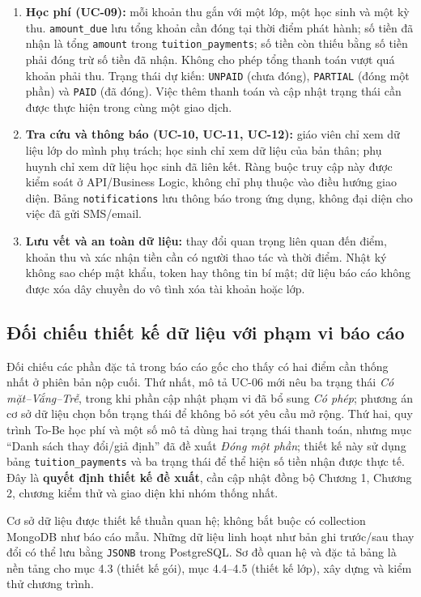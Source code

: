 \begin{enumerate}
\item \textbf{Học phí (UC-09):} mỗi khoản thu gắn với một lớp, một học sinh và một kỳ thu. \texttt{amount\_due} lưu tổng khoản cần đóng tại thời điểm phát hành; số tiền đã nhận là tổng \texttt{amount} trong \texttt{tuition\_payments}; số tiền còn thiếu bằng số tiền phải đóng trừ số tiền đã nhận. Không cho phép tổng thanh toán vượt quá khoản phải thu. Trạng thái dự kiến: \texttt{UNPAID} (chưa đóng), \texttt{PARTIAL} (đóng một phần) và \texttt{PAID} (đã đóng). Việc thêm thanh toán và cập nhật trạng thái cần được thực hiện trong cùng một giao dịch.
\item \textbf{Tra cứu và thông báo (UC-10, UC-11, UC-12):} giáo viên chỉ xem dữ liệu lớp do mình phụ trách; học sinh chỉ xem dữ liệu của bản thân; phụ huynh chỉ xem dữ liệu học sinh đã liên kết. Ràng buộc truy cập này được kiểm soát ở API/Business Logic, không chỉ phụ thuộc vào điều hướng giao diện. Bảng \texttt{notifications} lưu thông báo trong ứng dụng, không đại diện cho việc đã gửi SMS/email.
\item \textbf{Lưu vết và an toàn dữ liệu:} thay đổi quan trọng liên quan đến điểm, khoản thu và xác nhận tiền cần có người thao tác và thời điểm. Nhật ký không sao chép mật khẩu, token hay thông tin bí mật; dữ liệu báo cáo không được xóa dây chuyền do vô tình xóa tài khoản hoặc lớp.
\end{enumerate}

\subsection{Đối chiếu thiết kế dữ liệu với phạm vi báo cáo}

Đối chiếu các phần đặc tả trong báo cáo gốc cho thấy có hai điểm cần thống nhất ở phiên bản nộp cuối. Thứ nhất, mô tả UC-06 mới nêu ba trạng thái \textit{Có mặt--Vắng--Trễ}, trong khi phần cập nhật phạm vi đã bổ sung \textit{Có phép}; phương án cơ sở dữ liệu chọn bốn trạng thái để không bỏ sót yêu cầu mở rộng. Thứ hai, quy trình To-Be học phí và một số mô tả dùng hai trạng thái thanh toán, nhưng mục ``Danh sách thay đổi/giả định'' đã đề xuất \textit{Đóng một phần}; thiết kế này sử dụng bảng \texttt{tuition\_payments} và ba trạng thái để thể hiện số tiền nhận được thực tế. Đây là \textbf{quyết định thiết kế đề xuất}, cần cập nhật đồng bộ Chương 1, Chương 2, chương kiểm thử và giao diện khi nhóm thống nhất.

Cơ sở dữ liệu được thiết kế thuần quan hệ; không bắt buộc có collection MongoDB như báo cáo mẫu. Những dữ liệu linh hoạt như bản ghi trước/sau thay đổi có thể lưu bằng \texttt{JSONB} trong PostgreSQL. Sơ đồ quan hệ và đặc tả bảng là nền tảng cho mục 4.3 (thiết kế gói), mục 4.4--4.5 (thiết kế lớp), xây dựng và kiểm thử chương trình.

